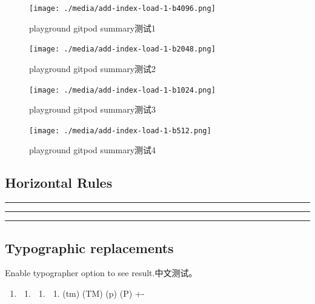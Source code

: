 \documentclass[
  paper=a4,
  ,captions=tableheading
]{scrartcl}
\providecommand{\tightlist}{%
  \setlength{\itemsep}{0pt}\setlength{\parskip}{0pt}}
\begin{document}
\begin{figure}
\centering
\texttt{[image: ./media/add-index-load-1-b4096.png]}
\caption{playground gitpod summary测试1}
\end{figure}

\begin{figure}
\centering
\texttt{[image: ./media/add-index-load-1-b2048.png]}
\caption{playground gitpod summary测试2}
\end{figure}

\begin{figure}
\centering
\texttt{[image: ./media/add-index-load-1-b1024.png]}
\caption{playground gitpod summary测试3}
\end{figure}

\begin{figure}
\centering
\texttt{[image: ./media/add-index-load-1-b512.png]}
\caption{playground gitpod summary测试4}
\end{figure}

\hypertarget{horizontal-rules}{%
\subsection{Horizontal Rules}\label{horizontal-rules}}

\begin{center}\rule{0.5\linewidth}{0.5pt}\end{center}

\begin{center}\rule{0.5\linewidth}{0.5pt}\end{center}

\begin{center}\rule{0.5\linewidth}{0.5pt}\end{center}

\hypertarget{typographic-replacements}{%
\subsection{Typographic replacements}\label{typographic-replacements}}

Enable typographer option to see result.中文测试。

\begin{enumerate}
\def\labelenumi{(\alph{enumi})}
\setcounter{enumi}{2}
\item
  \begin{enumerate}
  \def\labelenumii{(\Alph{enumii})}
  \setcounter{enumii}{2}
  \item
    \begin{enumerate}
    \def\labelenumiii{(\alph{enumiii})}
    \setcounter{enumiii}{17}
    \item
      \begin{enumerate}
      \def\labelenumiv{(\Alph{enumiv})}
      \setcounter{enumiv}{17}
      \tightlist
      \item
        (tm) (TM) (p) (P) +-
      \end{enumerate}
    \end{enumerate}
  \end{enumerate}
\end{enumerate}
\end{document}
